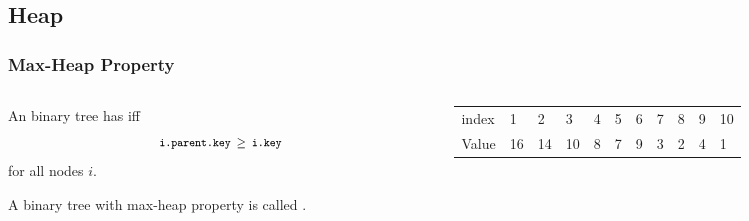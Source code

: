 \documentclass[10pt]{beamer}
\begin{document}
\subsection{Heap}
\begin{frame}[t]\frametitle{Max-Heap Property}

	\vspace{-0.5cm}
	\begin{columns}[T] %
	\begin{column}{.5\linewidth} %
		\begin{definition}
			An binary tree   has   
			iff
			\[
				\hCode{i.parent.key $\ge$ i.key} 
			\]
			for all nodes $i$.
			
			A binary tree with max-heap property is called .
		\end{definition}
		
	\end{column} %
	\begin{column}{.5\linewidth} %
		\begin{example}
		{\scriptsize
		\begin{figure}[htbp]
		\begin{center}
			
		\end{center}
		\end{figure}
		} %


		{\tiny 
			\begin{table}[t]
			\setlength{\tabcolsep}{5pt}
			\begin{tabular}
				{|
					p{.3cm} 
					!{\vrule width 1pt}
					*{10}{p{.05cm}|} 
				}
				\hline
				\textcolor{colorIndex}{index}	&\textcolor{colorIndex}{1}	&\textcolor{colorIndex}{2}	&\textcolor{colorIndex}{3}	&\textcolor{colorIndex}{4}	&\textcolor{colorIndex}{5}	&\textcolor{colorIndex}{6}	&\textcolor{colorIndex}{7}	&\textcolor{colorIndex}{8}	&\textcolor{colorIndex}{9}	&\textcolor{colorIndex}{10}\\
				Value	&16	&14	&10	&8	&7	&9	&3	&2	&4	&1\\
				\hline
			\end{tabular}
			\end{table}
		} %

		\end{example}

	\end{column} %
	\end{columns} %
\end{frame}
\end{document}

